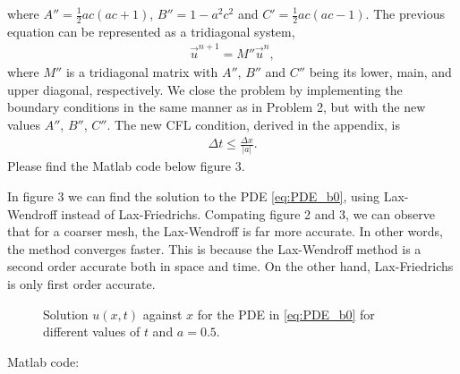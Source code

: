 \begin{questions}
\begin{solution}
where $A'' = \frac{1}{2}ac\left(ac+1\right)$, $B'' = 1-a^2c^2$ and $C' = \frac{1}{2}ac\left(ac-1\right)$. The previous equation can be represented as a tridiagonal system,
\begin{align}\label{eq:matrixForm}
\vec{u}^{n+1} = M''\vec{u}^n,
\end{align}
where $M''$ is a tridiagonal matrix with $A''$, $B''$ and $C''$ being its lower, main, and upper diagonal, respectively. We close the problem by implementing the boundary conditions in the same manner as  in Problem 2, but with the new values $A''$, $B''$, $C''$. The new CFL condition, derived in the appendix, is 
\begin{align*}
\Delta t\leq\frac{\Delta x}{|a|}.
\end{align*}
Please find the Matlab code below figure 3.
\end{solution}


\begin{solution}
In figure 3 we can find the solution to the PDE \eqref{eq:PDE_b0}, using Lax-Wendroff instead of Lax-Friedrichs. Compating figure 2 and 3, we can observe that for a coarser mesh, the Lax-Wendroff is far more accurate. In other words, the method converges faster. This is because the Lax-Wendroff method is a second order accurate both in space and time. On the other hand, Lax-Friedrichs is only first order accurate. 


\begin{figure}[H]
\centering     %
{}
\hspace{-0.9cm}
\hspace{-0.9cm}
\caption{Solution $u(x,t)$ against $x$ for the PDE in \eqref{eq:PDE_b0} for different values of $t$ and $a=0.5$.}
\end{figure}
Matlab code:

\end{solution}
\end{questions}